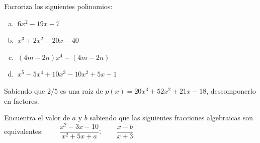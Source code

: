 \begin{mipropuesto}

Facroriza los siguientes polinomios:

\begin{multicols}{2}
\begin{enumerate}[a) ]
\item $\ 6x^2-19x-7$
\item $\ x^3+2x^2-20x-40$
\item $\ (4m-2n)x^4-(4m-2n)	$
\item $\ x^5-5x^4+10x^3-10x^2+5x-1$
\end{enumerate}	
\end{multicols}


\end{mipropuesto}



\vspace{-8mm}
\begin{flushright}
	\begin{footnotesize} \textcolor{gris}{}	\end{footnotesize}
\end{flushright}

\begin{mipropuesto}

Sabiendo que $2/5$ es una raíz de $p(x)=20x^3+52x^2+21x-18$, descomponerlo en factores.
\end{mipropuesto}

\vspace{-8mm}
\begin{flushright}
	\begin{footnotesize} \textcolor{gris}{}	\end{footnotesize}
\end{flushright}


\begin{mipropuesto}

Encuentra el valor de $a$ y $b$ sabiendo que las siguientes fracciones algebraicas son equivalentes:
$\qquad  \dfrac{x^2-3x-10}{x^2+5x+a};\qquad \dfrac{x-b}{x+3}$
\end{mipropuesto}

\vspace{-8mm}
\begin{flushright}
	\begin{footnotesize} \textcolor{gris}{}	\end{footnotesize}
\end{flushright}

